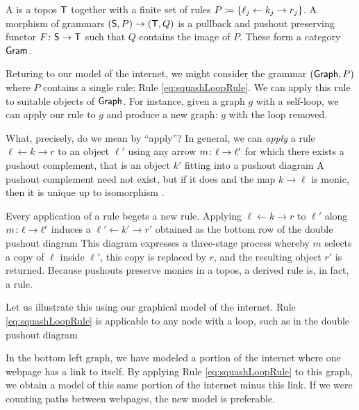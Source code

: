 \documentclass{amsart}
\begin{document}
\begin{definition}[Grammar] \label{def:grammar} A
   is a topos $ \mathsf{T} $ together with a
  finite set of rules
  $ P \coloneqq \{ \ell_j \leftarrow k_j \to r_j \} $. A
  morphism of grammars
  $ ( \mathsf{S} , P ) \to ( \mathsf{T} , Q ) $ is a pullback
  and pushout preserving functor
  $ F \colon \mathsf{S} \to \mathsf{T} $ such that $ Q $
  contains the image of $ P $. These form a
  category $ \mathsf{Gram} $.
\end{definition}

Returing to our model of the internet, we might consider the
grammar $ ( \mathsf{Graph}, P ) $ where $ P $ contains a single
rule: Rule \eqref{eq:squashLoopRule}. We can apply this rule
to suitable objects of $ \mathsf{Graph} $.  For instance, given a
graph $g$ with a self-loop, we can apply our rule to $ g $
and produce a new graph: $ g $ with the loop removed.

What, precisely, do we mean by ``apply''?
In general, we can \emph{apply} a rule
$ \ell \gets k \to r $ to an object $ \ell' $
using any arrow $ m \colon \ell \to \ell' $ for
which there exists a pushout complement, that is
an object $ k' $ fitting into a pushout diagram
 A pushout
complement need not exist, but if it does and the
map $ k \to \ell $ is monic, then it is unique up to isomorphism
\cite[Lem.~15]{LackSobo_Adhesive}.

Every application of a rule begets a new rule. Applying
$ \ell \gets k \to r $ to $\ell'$ along
$ m \colon \ell \to \ell' $ induces a 
$ \ell' \gets k' \to r' $ obtained as the bottom row of the
double pushout diagram  This diagram expresses a three-stage process whereby
$ m $ selects a copy of $ \ell $ inside $ \ell' $, this copy
is replaced by $ r $, and the resulting object $ r' $ is
returned.  Because pushouts preserve monics in a topos, a
derived rule is, in fact, a rule.

Let us illustrate this using our graphical model
of the internet.  Rule \eqref{eq:squashLoopRule}
is applicable to any node with a loop, such as in
the double pushout diagram

In the bottom left graph, we have modeled a
portion of the internet where one webpage has a
link to itself.  By applying Rule
\eqref{eq:squashLoopRule} to this graph, we obtain
a model of this same portion of the internet minus
this link. If we were counting paths between
webpages, the new model is preferable.  
\end{document}
